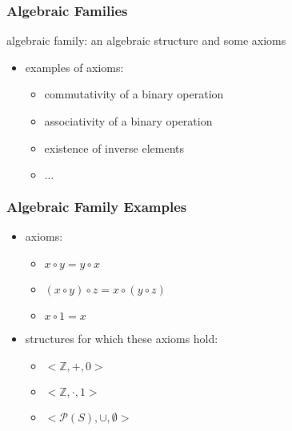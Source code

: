 \documentclass[dvipsnames]{beamer}
\begin{document}
\begin{frame}
  \frametitle{Algebraic Families}

  \begin{definition}
    \alert{algebraic family}: an algebraic structure and some axioms
  \end{definition}

  \begin{itemize}
    \item examples of axioms:
    \begin{itemize}
      \item commutativity of a binary operation
      \item associativity of a binary operation
      \item existence of inverse elements
      \item $\ldots$
    \end{itemize}
  \end{itemize}
\end{frame}

\begin{frame}
  \frametitle{Algebraic Family Examples}

  \begin{example}
    \begin{itemize}
      \item axioms:
      \begin{itemize}
        \item $x \circ y = y \circ x$
        \item $(x \circ y) \circ z = x \circ (y \circ z)$
        \item $x \circ 1 = x$
      \end{itemize}

      \pause
      \item structures for which these axioms hold:
      \begin{itemize}
       \item $<\mathbb{Z},+,0>$
       \item $<\mathbb{Z},\cdot,1>$
       \item $<\mathcal{P}(S),\cup,\emptyset>$
      \end{itemize}
    \end{itemize}
  \end{example}
\end{frame}
\end{document}
